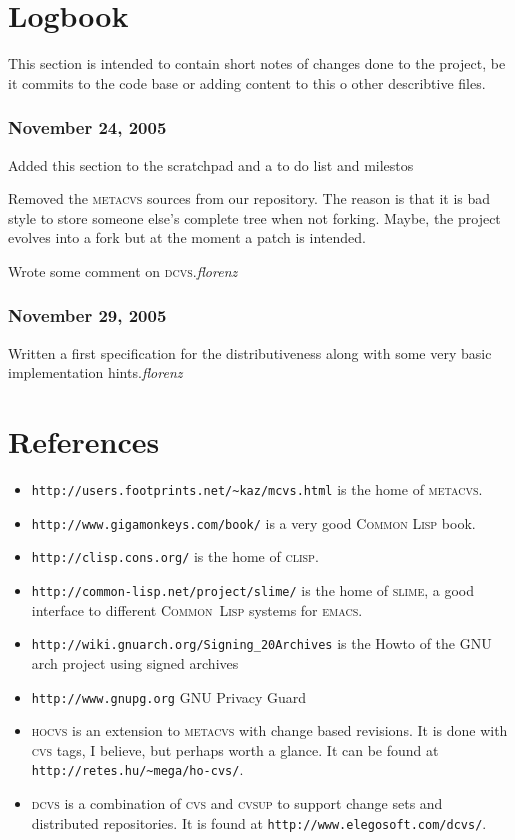 \documentclass[fleqn, german, 10pt, a4paper]{article}
\begin{document}
\section{Logbook}

This section is intended to contain short notes of changes done to the
project, be it commits to the code base or adding content to this o
other describtive files.

\subsubsection*{November 24, 2005}
Added this section to the scratchpad and a to do list and milestos

Removed the \textsc{metacvs} sources from our repository. The reason is
that it is bad style to store someone else's complete tree when not forking.
Maybe, the project evolves into a fork but at the moment a patch is
intended.

Wrote some comment on \textsc{dcvs}.\hfill{\textit{florenz}}


\subsubsection*{November 29, 2005}

Written a first specification for the distributiveness along with some
very basic implementation hints.\hfill{\textit{florenz}}


\section{References}

\begin{itemize}
\item \texttt{http://users.footprints.net/\textasciitilde{}kaz/mcvs.html} is the home of
\textsc{metacvs}.
\item \texttt{http://www.gigamonkeys.com/book/} is a very good
\textsc{Common Lisp} book.
\item \texttt{http://clisp.cons.org/} is the home of \textsc{clisp}.
\item \texttt{http://common-lisp.net/project/slime/} is the home of
\textsc{slime}, a good interface to different \textsc{Common~Lisp}
systems for \textsc{emacs}.
\item \texttt{http://wiki.gnuarch.org/Signing\_20Archives} is the Howto of the
GNU arch project using signed archives
\item \texttt{http://www.gnupg.org} GNU Privacy Guard
\item \textsc{hocvs} is an extension to \textsc{metacvs} with change based
revisions. It is done with \textsc{cvs} tags, I believe, but perhaps worth a
glance. It can be found at \texttt{http://retes.hu/\textasciitilde{}mega/ho-cvs/}.
\item \textsc{dcvs} is a combination of \textsc{cvs} and \textsc{cvsup}
to support change sets and distributed repositories. It is found
at \texttt{http://www.elegosoft.com/dcvs/}.
\end{itemize}
\end{document}
